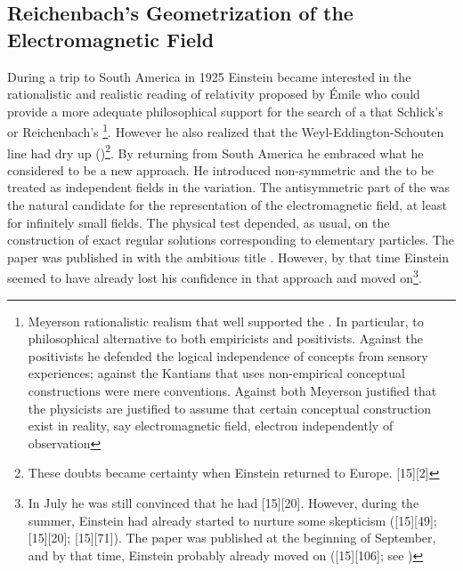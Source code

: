 \documentclass[draft]{article}
\begin{document}
\subsection{Reichenbach's Geometrization of the Electromagnetic Field}
%
During a trip to South America in 1925 Einstein became interested in the rationalistic and realistic reading of relativity proposed by \'Emile   who could provide a more adequate philosophical support for the search of a \uft that Schlick's or Reichenbach's \footnote{Meyerson rationalistic realism that well supported the \uftp. In particular, to philosophical alternative to both empiricists and positivists. Against the positivists he defended the logical independence of concepts from sensory experiences; against the Kantians that uses non-empirical  conceptual constructions were mere conventions. Against both Meyerson justified that the physicists are justified to assume that certain conceptual construction exist in reality, say electromagnetic field, electron independently of observation}. However he also realized that the Weyl-Eddington-Schouten line had dry up ()\footnote{These doubts became certainty when Einstein returned to Europe.  [15][2]}. By returning from South America he embraced what he considered to be a new approach. He introduced non-symmetric \Gtmn and the \gmn to be treated as independent fields in the variation. The antisymmetric part of the \gmn was the natural candidate for the representation of the electromagnetic field, at least for infinitely small fields. The physical test depended, as usual, on the construction of exact regular solutions corresponding to elementary particles. The paper was published in  with the ambitious title   \citep{Einstein1925}. However, by that time Einstein seemed to have already lost his confidence in that approach and moved on\footnote{In July he was still convinced that he had  [15][20]. However, during the summer, Einstein had already started to nurture some skepticism ([15][49]; [15][20]; [15][71]). The paper was published at the beginning of September, and by that time, Einstein probably already moved on ([15][106]; see \cite{Einstein1927c})}.
\end{document}
